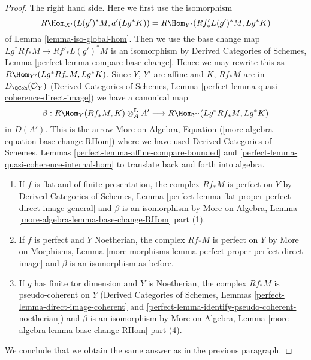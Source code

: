 \begin{proof}
\medskip\noindent
The right hand side. Here we first use the isomorphism
$$
R\Hom_{X'}(L(g')^*M, a'(Lg^*K)) = R\Hom_{Y'}(Rf'_*L(g')^*M, Lg^*K)
$$
of Lemma \ref{lemma-iso-global-hom}. Then we use the base change
map $Lg^*Rf_*M \to Rf'_*L(g')^*M$ is an isomorphism by
Derived Categories of Schemes, Lemma \ref{perfect-lemma-compare-base-change}.
Hence we may rewrite this as $R\Hom_{Y'}(Lg^*Rf_*M, Lg^*K)$.
Since $Y$, $Y'$ are affine and $K$, $Rf_*M$ are in $D_\QCoh(\mathcal{O}_Y)$
(Derived Categories of Schemes, Lemma
\ref{perfect-lemma-quasi-coherence-direct-image})
we have a canonical map
$$
\beta :
R\Hom_Y(Rf_*M, K) \otimes^\mathbf{L}_A A'
\longrightarrow
R\Hom_{Y'}(Lg^*Rf_*M, Lg^*K)
$$
in $D(A')$. This is the arrow
More on Algebra, Equation (\ref{more-algebra-equation-base-change-RHom})
where we have used Derived Categories of Schemes, Lemmas
\ref{perfect-lemma-affine-compare-bounded} and
\ref{perfect-lemma-quasi-coherence-internal-hom}
to translate back and forth into algebra.
\begin{enumerate}
\item If $f$ is flat and of finite presentation, the complex $Rf_*M$
is perfect on $Y$ by Derived Categories of Schemes, Lemma
\ref{perfect-lemma-flat-proper-perfect-direct-image-general}
and $\beta$ is an isomorphism by
More on Algebra, Lemma \ref{more-algebra-lemma-base-change-RHom} part (1).
\item If $f$ is perfect and $Y$ Noetherian, the complex $Rf_*M$
is perfect on $Y$ by More on Morphisms, Lemma
\ref{more-morphisms-lemma-perfect-proper-perfect-direct-image}
and $\beta$ is an isomorphism as before.
\item If $g$ has finite tor dimension and $Y$ is Noetherian,
the complex $Rf_*M$ is pseudo-coherent on $Y$
(Derived Categories of Schemes, Lemmas
\ref{perfect-lemma-direct-image-coherent} and
\ref{perfect-lemma-identify-pseudo-coherent-noetherian})
and $\beta$ is an isomorphism by
More on Algebra, Lemma \ref{more-algebra-lemma-base-change-RHom} part (4).
\end{enumerate}
We conclude that we obtain the same answer as in the previous paragraph.


\end{proof}
